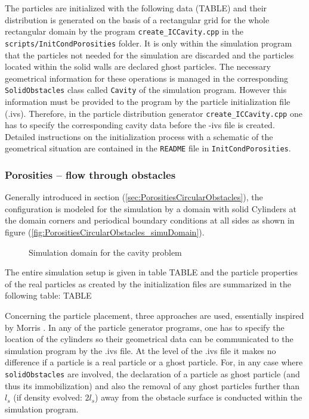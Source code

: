 \documentclass{report}
\begin{document}
The particles are initialized with the following data (TABLE) and their distribution is generated on the basis of a rectangular grid for the whole rectangular domain by the program {\tt create\_ICCavity.cpp} in the {\tt scripts/InitCondPorosities} folder. It is only within the simulation program that the particles not needed for the simulation are discarded and the particles located within the solid walls are declared ghost particles. The necessary geometrical information for these operations is managed in the corresponding {\tt SolidObstacles} class called {\tt Cavity} of the simulation program.
However this information must be provided to the program by the particle initialization file (.ivs). Therefore, in the particle distribution generator {\tt create\_ICCavity.cpp} one has to specify the corresponding cavity data before the -ivs file is created. Detailed instructions on the initialization process with a schematic of the geometrical situation are contained in the {\tt README} file in {\tt InitCondPorosities}.



\subsubsection{Porosities -- flow through obstacles}
\label{sec:SimuSetup_flowThroughObstacles}

Generally introduced in section (\ref{sec:PorositiesCircularObstacles}), the configuration is modeled for the simulation by a domain with solid Cylinders at the domain corners and periodical boundary conditions at all sides as shown in figure (\ref{fig:PorositiesCircularObstacles_simuDomain}). 

\begin{figure}[!htbp]
  \centering
  \caption{Simulation domain for the cavity problem }
  \label{fig:PorositiesCavitiesSimuDomain}
\end{figure}

 The entire simulation setup is given in table TABLE and the particle properties of the real particles as created by the initialization files are summarized in the following table:
\linebreak[2]
TABLE
\linebreak[2]

Concerning the particle placement, three approaches are used, essentially inspired by Morris \cite{Morris1997, Zhu1999}. In any of the particle generator programs, one has to specify the location of the cylinders so their geometrical data can be communicated to the simulation program by the .ivs file. At the level of the .ivs file it makes no difference if a particle is a real particle or a ghost particle. For, in any case where {\tt solidObstacles} are involved, the declaration of a particle as ghost particle (and thus its immobilization) and also the removal of any ghost particles further than $l_s$ (if density evolved: $2l_s$) away from the obstacle surface is conducted within the simulation program. 
\end{document}
